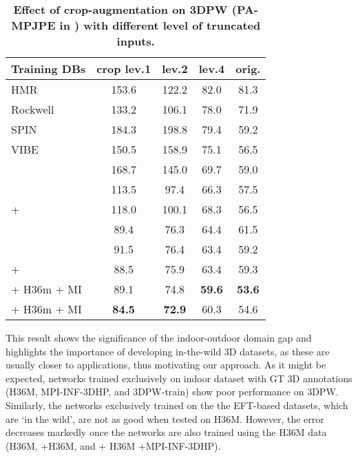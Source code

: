 \documentclass[10pt,twocolumn,letterpaper]{article}
\begin{document}
	\begin{table}[t]
		\centering
		\caption{
			\textbf{Effect of crop-augmentation on 3DPW (PA-MPJPE in ) with different level of truncated inputs.} 
		}\label{table:upperbody_3dpw}
		\centering
		\footnotesize
\begin{tabular}{lcccc}
			\toprule
			\textbf{Training DBs}	&  \!\!\textbf{crop lev.1}\!\!\!\!\!	&  \!\textbf{lev.2}\! &  \!\textbf{lev.4}\! &  \textbf{orig.}\\
			\midrule
			HMR~\cite{kanazawa2018end} & 153.6 & 122.2 & 82.0 & 81.3 \\ Rockwell \etal~\cite{Rockwell2020} & 133.2 & 106.1 & 78.0 & 71.9 \\
			SPIN~\cite{kolotouros2019spin} & 184.3 & 198.8 & 79.4 & 59.2\\
			VIBE~\cite{kolotouros2019spin} & 150.5 &  158.9 & 75.1& 56.5\\
			\midrule
			     & 168.7  & 145.0 & 69.7 & 59.0\\ 
			      & 113.5  & 97.4 & 66.3 & 57.5\\
			 +   &  118.0 &  100.1 & 68.3 & 56.5\\
     & 89.4  & 76.3 & 64.4 & 61.5\\
			      & 91.5  & 76.4 & 63.4 & 59.2\\
			 +  \!\!\!\!\! &  88.5 &  75.9 & 63.4 & 59.3\\
			
			 + H36m + MI   \!\!\!\!\!\!\!  & 89.1  & 74.8 &\textbf{59.6} & \textbf{53.6} \\
			 + H36m + MI   \!\!\!\!\!\!\!\!\!\!  & \textbf{84.5}  & \textbf{72.9} & 60.3 & 54.6 \\
			\bottomrule
		\end{tabular}
	\end{table}
	






	This result shows the significance of the indoor-outdoor domain gap and highlights the importance of developing in-the-wild 3D datasets, as these are usually closer to applications, thus motivating our approach. As it might be expected, networks trained exclusively on indoor dataset with GT 3D annotations (H36M, MPI-INF-3DHP, and 3DPW-train) show poor performance on 3DPW.
	Similarly, the networks exclusively trained on the the EFT-based datasets, which are `in the wild', are not as good when tested on H36M.
	However, the error decreases markedly once the networks are also trained using the H36M data (H36M, +H36M, and  + H36M +MPI-INF-3DHP).
	
\end{document}
